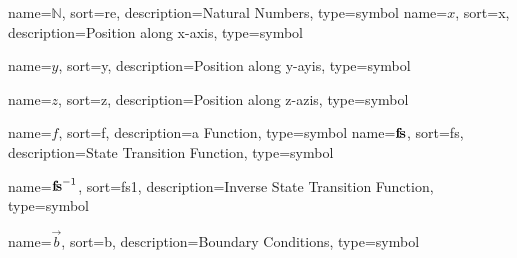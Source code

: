 	{%
		name=\ensuremath{\mathds{N}},
		sort=re,
		description=Natural Numbers,
		type=symbol
	}
	\renewcommand{\natural}{\gls{sym:natural}}
	{%
		name=\ensuremath{x},
		sort=x,
		description=Position along x-axis,
		type=symbol
	}
	\newcommand{\xcoord}{\gls{sym:xcoord}}

	{%
		name=\ensuremath{y},
		sort=y,
		description=Position along y-ayis,
		type=symbol
	}
	\newcommand{\ycoord}{\gls{sym:ycoord}}

	{%
		name=\ensuremath{z},
		sort=z,
		description=Position along z-azis,
		type=symbol
	}
	\newcommand{\zcoord}{\gls{sym:zcoord}}

	{%
		name=\ensuremath{f},
		sort=f,
		description=a Function,
		type=symbol
	}
	\newcommand{\function}{\gls{sym:function}}
	{%
	name=\ensuremath{\vecfunc{f\!s}},
		sort=fs,
		description=State Transition Function,
		type=symbol
	}
	\newcommand{\statetransfunc}{\gls{sym:statetransfunc}}

	{%
		name=\ensuremath{\vecfunc{f\!s}^{-1}},
		sort=fs1,
		description=Inverse State Transition Function,
		type=symbol
	}
	\newcommand{\invstatetransfunc}{\gls{sym:invstatetransfunc}}

	{%
		name=\ensuremath{\vec{b}},
		sort=b,
		description=Boundary Conditions,
		type=symbol
	}
	\newcommand{\boundaryconditions}{\gls{sym:boundaryconditions}}

